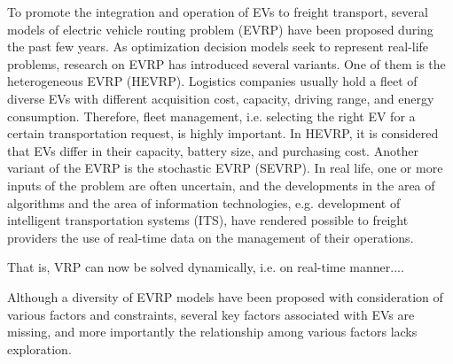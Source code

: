 \documentclass[11pt]{article}
\begin{document}
To promote the integration and operation of EVs to freight transport, several models of electric vehicle routing problem (EVRP) have been proposed during the past few years. As optimization decision models seek to represent real-life problems, research on EVRP has introduced several variants. One of them is the heterogeneous EVRP (HEVRP). Logistics companies usually hold a fleet of diverse EVs with different acquisition cost, capacity, driving range, and energy consumption. Therefore, fleet management, i.e. selecting the right EV for a certain transportation request, is highly important. In HEVRP, it is considered that EVs differ in their capacity, battery size, and purchasing cost. Another variant of the EVRP is the stochastic EVRP (SEVRP). In real life, one or more inputs of the problem are often uncertain, and the developments in the area of algorithms and the area of information technologies, e.g. development of intelligent transportation systems (ITS), have rendered possible to freight providers the use of real-time data on the management of their operations. 

That is, VRP can now be solved dynamically, i.e. on real-time manner....


Although a diversity of EVRP models have been proposed with consideration of various factors and constraints, several key factors associated with EVs are missing, and more importantly the relationship among various factors lacks exploration. 
\end{document}
